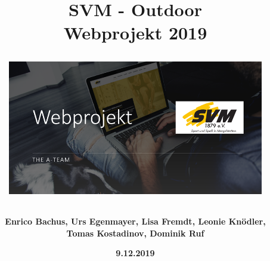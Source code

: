 \documentclass[12pt,a4paper]{article}
\begin{document}
\begin{titlepage}
\title{\vspace*{1cm} \huge{\textbf{SVM - Outdoor}} \\ \textbf{Webprojekt 2019}\\
\vspace*{2cm}
\begin{figure}[htb]
\advance\leftskip-2cm
\includegraphics[scale=1.2]{Startseite.png}
\end{figure}
\vspace{2cm}}
\author{\textbf{Enrico Bachus, Urs Egenmayer, Lisa Fremdt, Leonie Knödler,}\\ \textbf{Tomas Kostadinov, Dominik Ruf}}
\date{\vspace{2cm} \textbf{9.12.2019}}

\end{titlepage}
\maketitle
\newpage
\tableofcontents
\newpage
\end{document}
